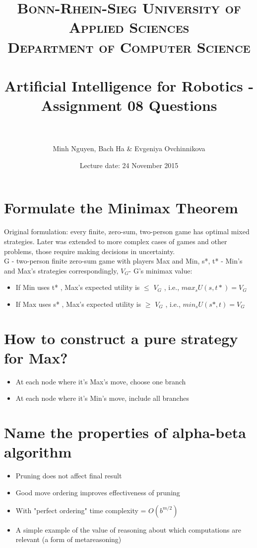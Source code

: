 \documentclass[paper=a4, fontsize=11pt]{scrartcl} %
\title{	
\normalfont \normalsize 
\textsc{Bonn-Rhein-Sieg University of Applied Sciences \\Department of Computer Science} \\ [10pt] %
\horrule{0.5pt} \\[0.4cm] %
\LARGE Artificial Intelligence for Robotics - Assignment 08 Questions \\ %
\horrule{2pt} \\[0.5cm] %
}
\author{Minh Nguyen, Bach Ha \& Evgeniya Ovchinnikova} %
\date{Lecture date: 24 November 2015}
\begin{document}
\maketitle %


\section{Formulate the Minimax Theorem}

Original formulation: every finite, zero-sum, two-person game has optimal mixed strategies. Later was extended to more complex cases of games and other problems, those require making decisions in uncertainty.\\

G - two-person finite zero-sum game with players Max and Min, s*, t* - Min's and Max's strategies correspondingly, $V_G$- G's minimax value:
\begin{itemize}
\item If Min uses t* , Max's expected utility is $\le$ $V_G$ , i.e., $max_s U (s, t*) = V_G$
\item If Max uses s* , Max's expected utility is $\ge$ $V_G$ , i.e., $min_s U (s*, t) = V_G$
\end{itemize}




\section{How to construct a pure strategy for Max?}

\begin{itemize}
\item At each node where it's Max's move, choose one branch
\item At each node where it's Min's move, include all branches
\end{itemize}

\section{Name the properties of alpha-beta algorithm}

\begin{itemize}
\item Pruning does not affect final result
\item Good move ordering improves effectiveness of pruning
\item With "perfect ordering" time complexity = $O(b^{m/2})$
\item A simple example of the value of reasoning about which computations are relevant (a form of metareasoning)
\end{itemize}
\end{document}
